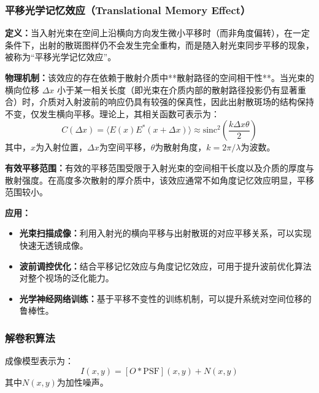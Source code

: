 

\subsubsection{平移光学记忆效应（Translational Memory Effect）}

    \textbf{定义：}当入射光束在空间上沿横向方向发生微小平移时（而非角度偏转），在一定条件下，出射的散斑图样仍不会发生完全重构，而是随入射光束同步平移的现象，被称为“平移光学记忆效应”。

    \textbf{物理机制：}该效应的存在依赖于散射介质中**散射路径的空间相干性**。当光束的横向位移 $\Delta x$ 小于某一相关长度（即光束在介质内部的散射路径投影仍有显著重合）时，介质对入射波前的响应仍具有较强的保真性，因此出射散斑场的结构保持不变，仅发生横向平移。理论上，其相关函数可表示为：
    \[
    C(\Delta x) = \langle E(x)E^*(x+\Delta x) \rangle \approx \text{sinc}^2\left(\frac{k \Delta x \theta}{2} \right)
    \]
    其中，$x$为入射位置，$\Delta x$为空间平移，$\theta$为散射角度，$k=2\pi/\lambda$为波数。

    \textbf{有效平移范围：}有效的平移范围受限于入射光束的空间相干长度以及介质的厚度与散射强度。在高度多次散射的厚介质中，该效应通常不如角度记忆效应明显，平移范围较小。

    \textbf{应用：}
    \begin{itemize}
        \item \textbf{光束扫描成像：}利用入射光的横向平移与出射散斑的对应平移关系，可以实现快速无透镜成像。
        \item \textbf{波前调控优化：}结合平移记忆效应与角度记忆效应，可用于提升波前优化算法对整个视场的泛化能力。
        \item \textbf{光学神经网络训练：}基于平移不变性的训练机制，可以提升系统对空间位移的鲁棒性。
    \end{itemize}






\subsubsection{解卷积算法}
成像模型表示为：
\[ I(x,y) = [O \ast \text{PSF}](x,y) + N(x,y) \]
其中$N(x,y)$为加性噪声。

